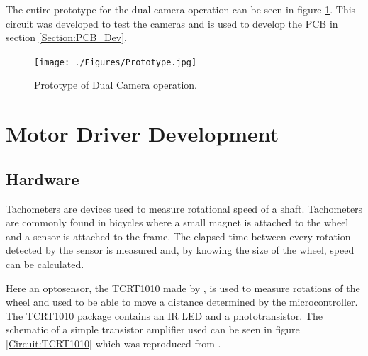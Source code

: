 The entire prototype for the dual camera operation can be seen in figure \ref{fig:Prototype}. This circuit was developed to test the cameras and is used to develop the PCB in section \ref{Section:PCB_Dev}. 
\begin{figure}
\texttt{[image: ./Figures/Prototype.jpg]}
\caption{Prototype of Dual Camera operation.}
\label{fig:Prototype}
\end{figure}
\section{Motor Driver Development}\label{Section:Motor_Dev}

\subsection{Hardware}
Tachometers are devices used to measure rotational speed of a shaft. Tachometers are commonly found in bicycles where a small magnet is attached to the wheel and a sensor is attached to the frame. The elapsed time between every rotation detected by the sensor is measured and, by knowing the size of the wheel, speed can be calculated. 

Here an optosensor, the TCRT1010 made by \cite{Vishay:TCRT1010:Datasheet}, is used to measure rotations of the wheel and used to be able to move a distance determined by the microcontroller. The TCRT1010 package contains an IR LED and a phototransistor. The schematic of a simple transistor amplifier used can be seen in figure \ref{Circuit:TCRT1010} which was reproduced from \cite{c9Lab:SRG}. 


